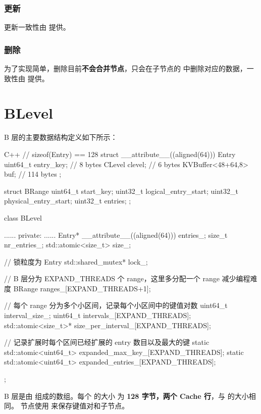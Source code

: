 \documentclass{mydoc}
\begin{document}
\subsubsection{更新}

更新一致性由  提供。

\subsubsection{删除}

为了实现简单，删除目前\textbf{不会合并节点}，只会在子节点的 
中删除对应的数据，一致性由  提供。

\section{BLevel}

B 层的主要数据结构定义如下所示：

\begin{codes}{C++}
// sizeof(Entry) == 128
struct __attribute__((aligned(64))) Entry {
  uint64_t entry_key;     // 8 bytes
  CLevel clevel;          // 6 bytes
  KVBuffer<48+64,8> buf;  // 114 bytes
};

struct BRange {
  uint64_t start_key;
  uint32_t logical_entry_start;
  uint32_t physical_entry_start;
  uint32_t entries;
};

class BLevel {
  ......
 private:
  ......
  Entry* __attribute__((aligned(64))) entries_;
  size_t nr_entries_;
  std::atomic<size_t> size_;

  // 锁粒度为 Entry
  std::shared_mutex* lock_;

  // B 层分为 EXPAND_THREADS 个 range，这里多分配一个 range 减少编程难度
  BRange ranges_[EXPAND_THREADS+1];

  // 每个 range 分为多个小区间，记录每个小区间中的键值对数
  uint64_t interval_size_;
  uint64_t intervals_[EXPAND_THREADS];
  std::atomic<size_t>* size_per_interval_[EXPAND_THREADS];

  // 记录扩展时每个区间已经扩展的 entry 数目以及最大的键
  static std::atomic<uint64_t> expanded_max_key_[EXPAND_THREADS];
  static std::atomic<uint64_t> expanded_entries_[EXPAND_THREADS];
};
\end{codes}

B 层是由  组成的数组。每个  的大小
为 \textbf{128 字节，两个 Cache 行}，与  的大小相同。
节点使用 \textbf{} 来保存键值对和子节点。
\end{document}
